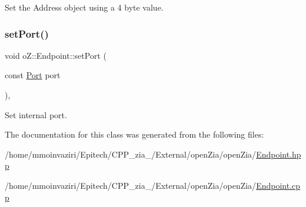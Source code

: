 Set the Address object using a 4 byte value. 

\mbox{\label{classo_z_1_1_endpoint_ab2e2765d1e7d6e40128772ac045872a0}} 
\subsubsection{\texorpdfstring{setPort()}{setPort()}}
{\footnotesize\ttfamily void o\+Z\+::\+Endpoint\+::set\+Port (\begin{DoxyParamCaption}\item[{const \mbox{\hyperlink{namespaceo_z_afeccb82d451972ba3b7d2a32b066b30b}{Port}}}]{port }\end{DoxyParamCaption})\hspace{0.3cm}{\ttfamily [inline]}, {\ttfamily [noexcept]}}



Set internal port. 



The documentation for this class was generated from the following files\+:\begin{DoxyCompactItemize}
\item 
/home/mmoinvaziri/\+Epitech/\+C\+P\+P\+\_\+zia\+\_/\+External/open\+Zia/open\+Zia/\mbox{\hyperlink{_endpoint_8hpp}{Endpoint.\+hpp}}\item 
/home/mmoinvaziri/\+Epitech/\+C\+P\+P\+\_\+zia\+\_/\+External/open\+Zia/open\+Zia/\mbox{\hyperlink{_endpoint_8cpp}{Endpoint.\+cpp}}\end{DoxyCompactItemize}
